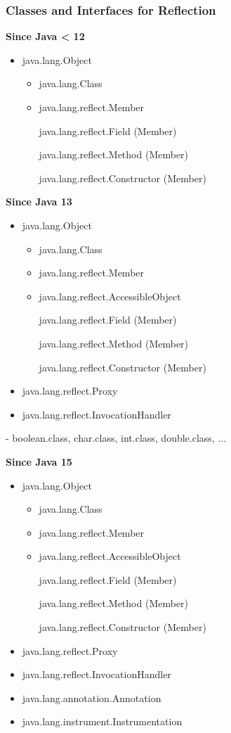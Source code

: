 \subsubsection{Classes and Interfaces for Reflection}

\textbf{Since Java < 12}

\begin{itemize}
	\item java.lang.Object
	\begin{itemize}
		\item java.lang.Class
		\item java.lang.reflect.Member
		
		java.lang.reflect.Field (Member)
		
		java.lang.reflect.Method (Member)
		
		java.lang.reflect.Constructor (Member)
		
	\end{itemize}
\end{itemize}

\textbf{Since Java 13}
\begin{itemize}
	\item java.lang.Object
	\begin{itemize}
		\item java.lang.Class
		\item java.lang.reflect.Member
		\item java.lang.reflect.AccessibleObject
		
		java.lang.reflect.Field (Member)
		
		java.lang.reflect.Method (Member)
		
		java.lang.reflect.Constructor (Member)
		
	\end{itemize}
	\item java.lang.reflect.Proxy
	\item java.lang.reflect.InvocationHandler
\end{itemize}

- boolean.class, char.class, int.class, double.class, ...

\textbf{Since Java 15}
\begin{itemize}
	\item java.lang.Object
	\begin{itemize}
		\item java.lang.Class
		\item java.lang.reflect.Member
		\item java.lang.reflect.AccessibleObject
		
		java.lang.reflect.Field (Member)
		
		java.lang.reflect.Method (Member)
		
		java.lang.reflect.Constructor (Member)
		
	\end{itemize}
	\item java.lang.reflect.Proxy
	\item java.lang.reflect.InvocationHandler
	\item java.lang.annotation.Annotation
	\item java.lang.instrument.Instrumentation
\end{itemize}

